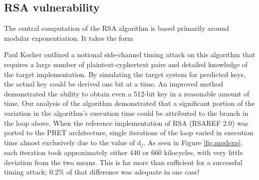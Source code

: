 \documentclass[times, 10pt,twocolumn]{article}
\begin{document}
\subsection{RSA vulnerability}
The central computation of the RSA algorithm is based primarily around modular exponentiation.  It takes the form 

\begin{center}\end{center}

Paul Kocher outlined\cite{Kocher96timingattacks} a notional side-channel timing attack on this algorithm that requires a large number of plaintext-cyphertext pairs and detailed knowledge of the target implementation.  By simulating the target system for predicted keys, the actual key could be derived one bit at a time.  An improved method \cite{DKLMQW98} demonstrated the ability to obtain even a 512-bit key in a reasonable amount of time.  Our analysis of the algorithm demonstrated that a significant portion of the variation in the algorithm's execution time could be attributed to the branch in the loop above.  When the reference implementation of RSA (RSAREF 2.0) was ported to the PRET architecture, single iterations of the loop varied in execution time almost exclusively due to the value of d$_{j}$.  As seen in Figure \ref{fig:modexp}, each iteration took approximately either 440 or 660 kilocycles, with very little deviation from the two means.  This is far more than sufficient for a successful timing attack; 0.2\% of that difference was adequate in one case! \cite{DKLMQW98}
\end{document}
